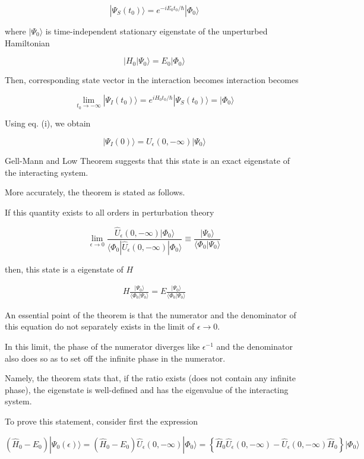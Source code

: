 ﻿\documentclass[twoside]{book}
\numberwithin{equation}{section}
\begin{document}
\[|\Psi_S(t_0)\rangle = e^{-i E_0 t_0/\hbar}|\Phi_0\rangle \]

where $|\Psi_0\rangle$ is time-independent stationary eigenstate of the unperturbed Hamiltonian

\[|H_0|\Psi_0\rangle = E_0|\Phi_0\rangle\]

Then, corresponding state vector in the interaction becomes interaction becomes 

\[\lim_{t_0\to-\infty}|\Psi_I(t_0)\rangle = e^{i H_0t_0/\hbar}|\Psi_S(t_0)\rangle = |\Phi_0\rangle \]

Using eq. (i), we obtain

\[|\Psi_I(0)\rangle = U_\epsilon (0,-\infty)|\Psi_0\rangle \]

Gell-Mann and Low Theorem suggests that this state is an exact eigenstate of the interacting system. 

More accurately, the theorem is stated as follows. 

If this quantity exists to all orders in perturbation theory

\[\lim_{\epsilon\to0}\frac{\hat{U}_\epsilon(0,-\infty)|\Phi_0\rangle}{\langle\Phi_0|\hat{U}_\epsilon(0,-\infty)|\Phi_0\rangle} \equiv \frac{|\Psi_0\rangle}{\langle\Phi_0|\Psi_0\rangle} \]

then, this state is a eigenstate of $H$

\begin{align}
H\frac{|\Psi_0\rangle}{\langle\Phi_0|\Psi_0\rangle} = E\frac{|\Psi_0\rangle}{\langle\Phi_0|\Psi_0\rangle}
\end{align}

An essential point of the theorem is that the numerator and the denominator of this equation do not separately exists in the limit of $\epsilon\to0$. 

In this limit, the phase of the numerator diverges like $\epsilon^{-1}$ and the denominator also does so as to set off the infinite phase in the numerator. 

Namely, the theorem stats that, if the ratio exists (does not contain any infinite phase), the eigenstate is well-defined and has the eigenvalue of the interacting system. 

To prove this statement, consider first the expression

\[(\hat{H}_0-E_0)|\Psi_0(\epsilon)\rangle = (\hat{H}_0-E_0)\hat{U}_\epsilon(0,-\infty)|\Phi_0\rangle = \left\{\hat{H}_0\hat{U}_\epsilon(0,-\infty)-\hat{U}_\epsilon(0,-\infty)\hat{H}_0\right\}|\Phi_0\rangle \]
\end{document}
